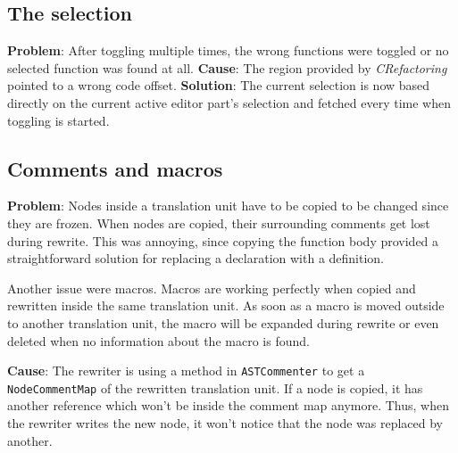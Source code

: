 \subsection{The selection}
\textbf{Problem}: After toggling multiple times, the wrong functions were 
toggled or no selected function was found at all. 
\textbf{Cause}: The region provided by \textit{CRefactoring} pointed to a wrong 
code offset. 
\textbf{Solution}: The current selection is now based directly on the current 
active editor part's selection and fetched every time when toggling is started.

\subsection{Comments and macros}
\textbf{Problem}: Nodes inside a translation unit have to be copied to be 
changed since they are frozen. When nodes are copied, their surrounding comments 
get lost during rewrite\cite{Sommerlad:2008:RCR:1449814.1449817}. This was annoying, since copying the function body 
provided a straightforward solution for replacing a declaration with a 
definition.

Another issue were macros. Macros are working perfectly when copied and 
rewritten inside the same translation unit. As soon as a macro is moved outside 
to another translation unit, the macro will be expanded during rewrite or even
deleted when no information about the macro is found.

\textbf{Cause}: The rewriter is using a method in \texttt{ASTCommenter} to get a 
\texttt{NodeCommentMap} of the rewritten translation unit. If a node is copied, 
it has another reference which won't be inside the comment map anymore. Thus, 
when the rewriter writes the new node, it won't notice that the node was 
replaced by another.

